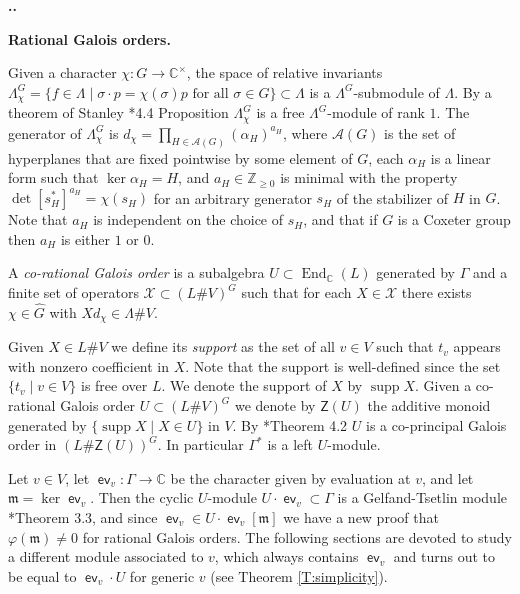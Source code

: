 \documentclass[11pt,fleqn]{amsart}
\renewcommand\thesection{\arabic{section}}
\newcounter{para}[section]
\renewcommand\thepara{\thesection.\arabic{para}}
\def\paragraph{%
 \noindent
 \refstepcounter{para}%
 \textbf{\thepara.}\hspace{1ex}%
}
\newcommand\about[1]{%
 {\bfseries#1.}%
}
\newcommand\CC{\mathbb C}
\renewcommand\to{\longrightarrow}
\renewcommand\phi{\varphi}
\newcommand\A{\mathcal A}
\newcommand\Z{\mathsf Z}
\newcommand\m{\mathfrak m}
\DeclareMathOperator\End{End}
\DeclareMathOperator\ev{\mathsf{ev}}
\DeclareMathOperator\supp{supp}
\begin{document}
\paragraph
\about{Rational Galois orders} 
Given a character $\chi: G \to \CC^\times$, the space of relative invariants 
$\Lambda^G_\chi = \{f \in \Lambda \mid \sigma \cdot p = \chi(\sigma)p 
\mbox{ for all } \sigma \in G\} \subset \Lambda$ is a $\Lambda^G$-submodule of 
$\Lambda$. By a theorem of Stanley \cite{Hiller-coxeter-book}*{4.4 Proposition}
$\Lambda^G_\chi$ is a free $\Lambda^G$-module of rank $1$. The generator of 
$\Lambda^G_\chi$ is $d_\chi = \prod_{H \in \A(G)} (\alpha_H)^{a_H}$,
where $\A(G)$ is the set of hyperplanes that are fixed pointwise by some 
element of $G$, each $\alpha_H$ is a linear form such that $\ker \alpha_H = 
H$, and $a_H \in {\mathbb Z}_{\geq 0}$ is minimal with the property 
$\det[s_H^*]^{a_H} = \chi(s_H)$ for an arbitrary generator $s_H$ of the 
stabilizer of $H$ in $G$. Note that $a_H$ is independent on the choice of 
$s_H$, and that if $G$ is a Coxeter group then $a_H$ is either 
$1$ or $0$.

\begin{Definition}
A \emph{co-rational Galois order} is a subalgebra $U \subset \End_\CC(L)$
generated by $\Gamma$ and a finite set of operators $\mathcal X \subset 
(L \# V)^G$ such that for each $X \in \mathcal X$ there exists 
$\chi \in \hat G$ with $X d_\chi \in \Lambda \# V$.
\end{Definition}

Given $X \in L\# V$ we define its \emph{support} as the set of all $v \in V$ 
such that $t_v$ appears with nonzero coefficient in $X$. Note that the support 
is well-defined since the set $\{t_v \mid v \in V\}$ is free over $L$. We 
denote the support of $X$ by $\supp X$. Given a co-rational Galois order $U 
\subset (L\# V)^G$ we denote by $\Z(U)$ the additive monoid generated by 
$\{\supp X \mid X \in U\}$ in $V$. By \cite{Hart-rational-galois}*{Theorem 4.2}
$U$ is a co-principal Galois order in $(L\# \Z(U))^G$. In particular 
$\Gamma^*$ is a left $U$-module.

Let $v \in V$, let $\ev_v: \Gamma \to \CC$ be the character given by 
evaluation at $v$, and let $\m = \ker \ev_v$. Then the cyclic $U$-module $U 
\cdot \ev_v \subset \Gamma$ is a Gelfand-Tsetlin module 
\cite{Hart-rational-galois}*{Theorem 3.3}, and since $\ev_v \in U \cdot 
\ev_v[\m]$ we have a new proof that $\phi(\m) \neq 0$ for rational Galois 
orders. The following sections are devoted to study a different module 
associated to $v$, which always contains $\ev_v$ and turns out to be equal to 
$\ev_v \cdot U$ for generic $v$ (see Theorem \ref{T:simplicity}).
\end{document}
